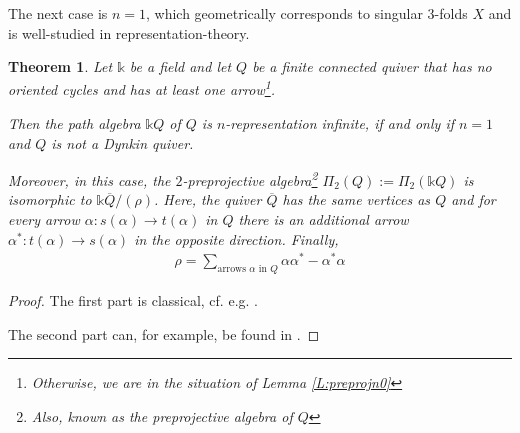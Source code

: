 \documentclass[a4paper,11pt, reqno]{amsart}
\theoremstyle{plain}
\newtheorem{theorem}[dummy]{Theorem}
\theoremstyle{definition}
\numberwithin{equation}{section}
\newlength{\arrow}
\begin{document}
The next case is $n=1$, which geometrically corresponds to singular $3$-folds $X$ and is well-studied in representation-theory.

\begin{theorem}\label{T:Preprojn1}
 Let $\mathbb k$ be a field and let $Q$ be a finite connected quiver that has no oriented cycles and has at least one arrow\footnote{Otherwise, we are in the situation of Lemma \ref{L:preprojn0}}. 

Then the path algebra $\mathbb{k}Q$ of $Q$ is $n$-representation infinite, if and only if $n=1$ and $Q$ is not a Dynkin quiver.

Moreover, in this case, the $2$-preprojective algebra\footnote{Also, known as the preprojective algebra of $Q$} $\Pi_2(Q):=\Pi_2(\mathbb{k}Q)$ is isomorphic to $\mathbb{k}\overline{Q}/(\rho)$. Here, the quiver $\overline{Q}$ has the same vertices as $Q$ and for every arrow $\alpha\colon s(\alpha) \to t(\alpha)$ in $Q$
there is an additional arrow $\alpha^*\colon t(\alpha) \to s(\alpha)$ in the opposite direction. Finally, 
\begin{align}
    \rho=\sum_{\textrm{arrows } \alpha \text{ in } Q} \alpha \alpha^* - \alpha^* \alpha
\end{align}
  
\end{theorem}
\begin{proof}
The first part is classical, cf. e.g. \cite[Example 3.11 (a)]{IyamaICM}.



The second part can, for example, be found in \cite[Theorem A]{RingelPreprojective}.
\end{proof}
\end{document}
